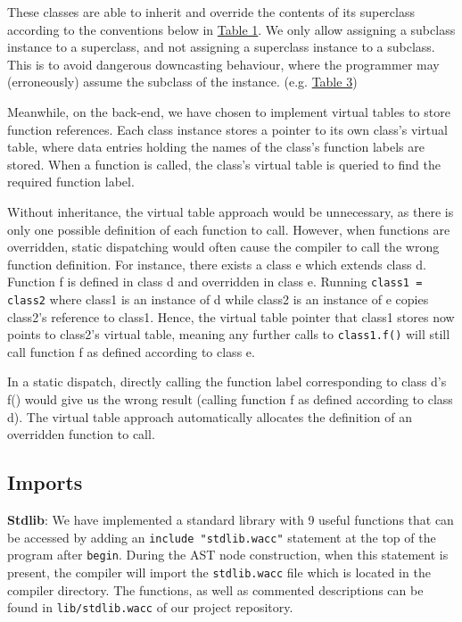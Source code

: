 \documentclass[11pt,a4paper]{article}
\newcommand{\cmd}[1]{\texttt{#1}}
\begin{document}
These classes are able to inherit and override the contents of its superclass according to the conventions below in \hyperref[sec:table1]{Table 1}. We only allow assigning a subclass instance to a superclass, and not assigning a superclass instance to a subclass. This is to avoid dangerous downcasting behaviour, where the programmer may (erroneously) assume the subclass of the instance. (e.g. \hyperref[sec:table23]{Table 3})

Meanwhile, on the back-end, we have chosen to implement virtual tables to store function references. Each class instance stores a pointer to its own class’s virtual table, where data entries holding the names of the class’s function labels are stored. When a function is called, the class’s virtual table is queried to find the required function label. 

Without inheritance, the virtual table approach would be unnecessary, as there is only one possible definition of each function to call. However, when functions are overridden, static dispatching would often cause the compiler to call the wrong function definition. For instance, there exists a class e which extends class d. Function f is defined in class d and overridden in class e. Running \cmd{class1 = class2} where class1 is an instance of d while class2 is an instance of e copies class2’s reference to class1. Hence, the virtual table pointer that class1 stores now points to class2’s virtual table, meaning any further calls to \cmd{class1.f()} will still call function f as defined according to class e. 

In a static dispatch, directly calling the function label corresponding to class d’s f() would give us the wrong result (calling function f as defined according to class d). The virtual table approach automatically allocates the definition of an overridden function to call. 

\subsection{Imports}
\noindent \textbf{Stdlib}: We have implemented a standard library with 9 useful functions that can be accessed by adding an \cmd{include "stdlib.wacc"} statement at the top of the program after \cmd{begin}. During the AST node construction, when this statement is present, the compiler will import the \cmd{stdlib.wacc} file which is located in the compiler directory. The functions, as well as commented descriptions can be found in \cmd{lib/stdlib.wacc} of our project repository.
\newline
\end{document}
